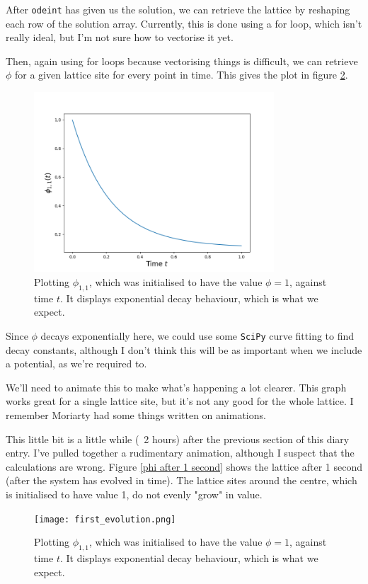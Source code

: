 \documentclass{article}
\begin{document}
After \texttt{odeint} has given us the solution, we can retrieve the lattice by reshaping each row of the solution array. Currently, this is done using a for loop, which isn't really ideal, but I'm not sure how to vectorise it yet.

Then, again using for loops because vectorising things is difficult, we can retrieve $\phi$ for a given lattice site for every point in time. This gives the plot in figure \ref{first phi plot}.

\begin{figure}
	\centering
	\includegraphics[width=0.8\textwidth]{phi_plot.png}
	\caption{\label{first phi plot}Plotting $\phi_{1,1}$, which was initialised to have the value $\phi=1$, against time $t$. It displays exponential decay behaviour, which is what we expect.}
\end{figure}

Since $\phi$ decays exponentially here, we could use some \texttt{SciPy} curve fitting to find decay constants, although I don't think this will be as important when we include a potential, as we're required to.

\medskip

We'll need to animate this to make what's happening a lot clearer. This graph works great for a single lattice site, but it's not any good for the whole lattice. I remember Moriarty had some things written on animations.

\medskip

This little bit is a little while (~2 hours) after the previous section of this diary entry. I've pulled together a rudimentary animation, although I suspect that the calculations are wrong. Figure \ref{phi after 1 second} shows the lattice after 1 second (after the system has evolved in time). The lattice sites around the centre, which is initialised to have value 1, do not evenly "grow" in value.

\begin{figure}
	\centering
	\texttt{[image: first\_evolution.png]}
	\caption{\label{first phi plot}Plotting $\phi_{1,1}$, which was initialised to have the value $\phi=1$, against time $t$. It displays exponential decay behaviour, which is what we expect.}
\end{figure}
\end{document}
